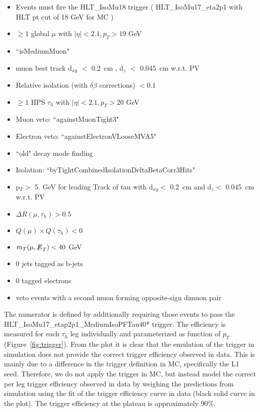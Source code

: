 \begin{itemize}
  \item Events must fire the HLT{\_}IsoMu18 trigger ( HLT{\_}IsoMu17{\_}eta2p1 with HLT pt cut of 18 GeV for MC )
  \item $\ge 1$ global $\mu$ with $|\eta| < 2.1, p_{T} > 19$ GeV
  \item ``isMediumMuon"
  \item muon best track d$_{xy}$ $<$ 0.2~cm , d$_{z}$ $<$ 0.045~cm w.r.t. PV
  \item Relative isolation (with $\delta\beta$ corrections) $< 0.1$
  \item $\ge 1$ HPS $\tau_{h}$ with $|\eta| < 2.1, p_{T} > 20$ GeV
  \item Muon veto: ``againstMuonTight3"
  \item Electron veto: ``againstElectronVLooseMVA5"
  \item ``old" decay mode finding %
  \item Isolation: ``byTightCombinedIsolationDeltaBetaCorr3Hits"
  \item p$_{T} >$ 5. GeV for leading Track of tau with d$_{xy} <$ 0.2~cm and d$_{z} <$ 0.045~cm w.r.t. PV
  \item $\Delta R(\mu,\tau_{h}) > 0.5$
  \item $Q(\mu) \times Q(\tau_{h}) < 0 $
  \item $m_{T}(\mu,{\not\mathrel{E}}_T) < 40$ GeV
  \item 0 jets tagged as b-jets
  \item 0 tagged electrons
  \item veto events with a second muon forming opposite-sign dimuon pair
\end{itemize}

The numerator is defined by additionally requiring those events to 
pass the \\
HLT{\_}IsoMu17{\_}etap2p1{\_}MediumIsoPFTau40* trigger. 
The efficiency is measured for each $\tau_{h}$ leg individually and
parameterized as function of $p_{T}$ (Figure~\ref{fig:trigger}). From the 
plot it is clear that the emulation of the trigger in simulation does not 
provide the correct trigger efficiency observed in data. This is mainly 
due to a difference in the trigger definition in MC, specifically the 
L1 seed. Therefore, we do not apply the trigger in MC, but instead model 
the correct per leg trigger efficiency observed in data by weighing the 
predictions from simulation using the fit of the trigger efficiency 
curve in data (black solid curve in the plot). The trigger efficiency at 
the plateau is approximately 90\%. 

